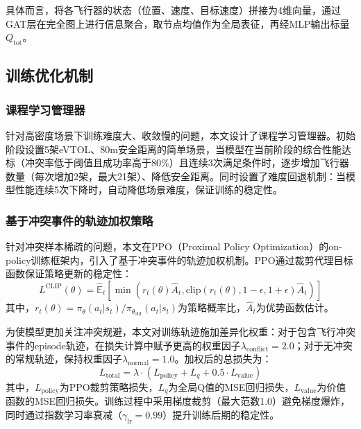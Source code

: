 \documentclass[12pt,a4paper,UTF8]{ctexart}
\begin{document}
具体而言，将各飞行器的状态（位置、速度、目标速度）拼接为4维向量，通过GAT层在完全图上进行信息聚合，取节点均值作为全局表征，再经MLP输出标量$Q_{\text{tot}}$。

\subsection{训练优化机制}
\subsubsection{课程学习管理器}
针对高密度场景下训练难度大、收敛慢的问题，本文设计了课程学习管理器。初始阶段设置5架eVTOL、80m安全距离的简单场景，当模型在当前阶段的综合性能达标（冲突率低于阈值且成功率高于80\%）且连续3次满足条件时，逐步增加飞行器数量（每次增加2架，最大21架）、降低安全距离。同时设置了难度回退机制：当模型性能连续5次下降时，自动降低场景难度，保证训练的稳定性。

\subsubsection{基于冲突事件的轨迹加权策略}
针对冲突样本稀疏的问题，本文在PPO（Proximal Policy Optimization）的on-policy训练框架内，引入了基于冲突事件的轨迹加权机制。PPO通过裁剪代理目标函数保证策略更新的稳定性\cite{ref2,ref6}：
\begin{equation}
    L^{\text{CLIP}}(\theta) = \hat{\mathbb{E}}_t\left[\min\left(r_t(\theta)\hat{A}_t, \text{clip}(r_t(\theta), 1-\epsilon, 1+\epsilon)\hat{A}_t\right)\right]
\end{equation}
其中，$r_t(\theta) = \pi_\theta(a_t|s_t) / \pi_{\theta_{\text{old}}}(a_t|s_t)$为策略概率比，$\hat{A}_t$为优势函数估计。

为使模型更加关注冲突规避，本文对训练轨迹施加差异化权重：对于包含飞行冲突事件的episode轨迹，在损失计算中赋予更高的权重因子$\lambda_{\text{conflict}} = 2.0$；对于无冲突的常规轨迹，保持权重因子$\lambda_{\text{normal}} = 1.0$。加权后的总损失为：
\begin{equation}
    L_{\text{total}} = \lambda \cdot \left(L_{\text{policy}} + L_{q} + 0.5 \cdot L_{\text{value}}\right)
\end{equation}
其中，$L_{\text{policy}}$为PPO裁剪策略损失，$L_q$为全局Q值的MSE回归损失，$L_{\text{value}}$为价值函数的MSE回归损失。训练过程中采用梯度裁剪（最大范数1.0）避免梯度爆炸，同时通过指数学习率衰减（$\gamma_{\text{lr}}=0.99$）提升训练后期的稳定性。
\end{document}
